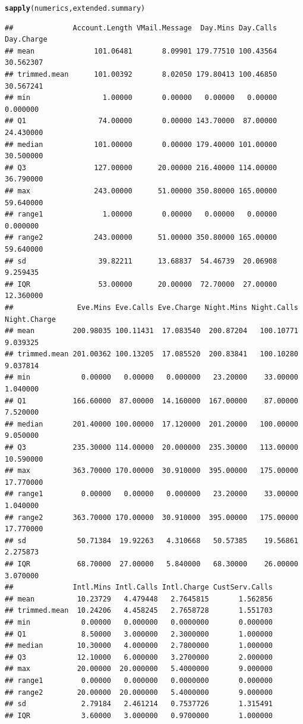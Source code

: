 \documentclass{article}\usepackage[]{graphicx}\usepackage[]{color}
\makeatletter
\newcommand{\hlstd}[1]{\textcolor[rgb]{0.345,0.345,0.345}{#1}}%
\newcommand{\hlkwd}[1]{\textcolor[rgb]{0.737,0.353,0.396}{\textbf{#1}}}%
\newenvironment{kframe}{%
 \def\at@end@of@kframe{}%
 \ifinner\ifhmode%
  \def\at@end@of@kframe{\end{minipage}}%
  \begin{minipage}{\columnwidth}%
 \fi\fi%
 \def\FrameCommand##1{\hskip\@totalleftmargin \hskip-\fboxsep
 \colorbox{shadecolor}{##1}\hskip-\fboxsep
     \hskip-\linewidth \hskip-\@totalleftmargin \hskip\columnwidth}%
 \MakeFramed {\advance\hsize-\width
   \@totalleftmargin\z@ \linewidth\hsize
   \@setminipage}}%
 {\par\unskip\endMakeFramed%
 \at@end@of@kframe}
\newenvironment{knitrout}{}{} %
\makeatother
\begin{document}
\begin{description}
\begin{knitrout}
\begin{kframe}
\begin{alltt}
\hlkwd{sapply}\hlstd{(numerics, extended.summary)}
\end{alltt}
\begin{verbatim}
##              Account.Length VMail.Message  Day.Mins Day.Calls Day.Charge
## mean              101.06481       8.09901 179.77510 100.43564  30.562307
## trimmed.mean      101.00392       8.02050 179.80413 100.46850  30.567241
## min                 1.00000       0.00000   0.00000   0.00000   0.000000
## Q1                 74.00000       0.00000 143.70000  87.00000  24.430000
## median            101.00000       0.00000 179.40000 101.00000  30.500000
## Q3                127.00000      20.00000 216.40000 114.00000  36.790000
## max               243.00000      51.00000 350.80000 165.00000  59.640000
## range1              1.00000       0.00000   0.00000   0.00000   0.000000
## range2            243.00000      51.00000 350.80000 165.00000  59.640000
## sd                 39.82211      13.68837  54.46739  20.06908   9.259435
## IQR                53.00000      20.00000  72.70000  27.00000  12.360000
##               Eve.Mins Eve.Calls Eve.Charge Night.Mins Night.Calls Night.Charge
## mean         200.98035 100.11431  17.083540  200.87204   100.10771     9.039325
## trimmed.mean 201.00362 100.13205  17.085520  200.83841   100.10280     9.037814
## min            0.00000   0.00000   0.000000   23.20000    33.00000     1.040000
## Q1           166.60000  87.00000  14.160000  167.00000    87.00000     7.520000
## median       201.40000 100.00000  17.120000  201.20000   100.00000     9.050000
## Q3           235.30000 114.00000  20.000000  235.30000   113.00000    10.590000
## max          363.70000 170.00000  30.910000  395.00000   175.00000    17.770000
## range1         0.00000   0.00000   0.000000   23.20000    33.00000     1.040000
## range2       363.70000 170.00000  30.910000  395.00000   175.00000    17.770000
## sd            50.71384  19.92263   4.310668   50.57385    19.56861     2.275873
## IQR           68.70000  27.00000   5.840000   68.30000    26.00000     3.070000
##              Intl.Mins Intl.Calls Intl.Charge CustServ.Calls
## mean          10.23729   4.479448   2.7645815       1.562856
## trimmed.mean  10.24206   4.458245   2.7658728       1.551703
## min            0.00000   0.000000   0.0000000       0.000000
## Q1             8.50000   3.000000   2.3000000       1.000000
## median        10.30000   4.000000   2.7800000       1.000000
## Q3            12.10000   6.000000   3.2700000       2.000000
## max           20.00000  20.000000   5.4000000       9.000000
## range1         0.00000   0.000000   0.0000000       0.000000
## range2        20.00000  20.000000   5.4000000       9.000000
## sd             2.79184   2.461214   0.7537726       1.315491
## IQR            3.60000   3.000000   0.9700000       1.000000
\end{verbatim}
\end{kframe}
\end{knitrout}



\end{description}
\end{document}
